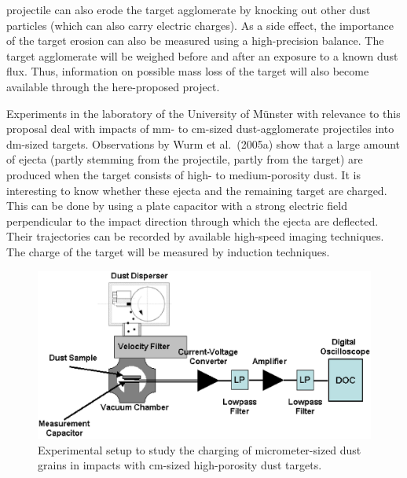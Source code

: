 projectile can also erode the target agglomerate by knocking out
other dust particles (which can also carry electric charges). As a
side effect, the importance of the target erosion can also be
measured using a high-precision balance. The target agglomerate
will be weighed before and after an exposure to a known dust flux.
Thus, information on possible mass loss of the target will also
become available through the here-proposed project.
\par
Experiments in the laboratory of the University of M\"unster with
relevance to this proposal deal with impacts of mm- to cm-sized
dust-agglomerate projectiles into dm-sized targets. Observations
by Wurm et al.\ (2005a) show that a large amount of ejecta (partly
stemming from the projectile, partly from the target) are produced
when the target consists of high- to medium-porosity dust. It is
interesting to know whether these ejecta and the remaining target
are charged. This can be done by using a plate capacitor with a
strong electric field perpendicular to the impact direction
through which the ejecta are deflected. Their trajectories can be
recorded by available high-speed imaging techniques. The charge of
the target will be measured by induction techniques.


\begin{figure}
\centerline{\includegraphics[width=16cm]{b1fig1.eps}}
\caption{\label{fig1blum1}Experimental setup to study the charging
of micrometer-sized dust grains in impacts with cm-sized
high-porosity dust targets.}
\end{figure}


